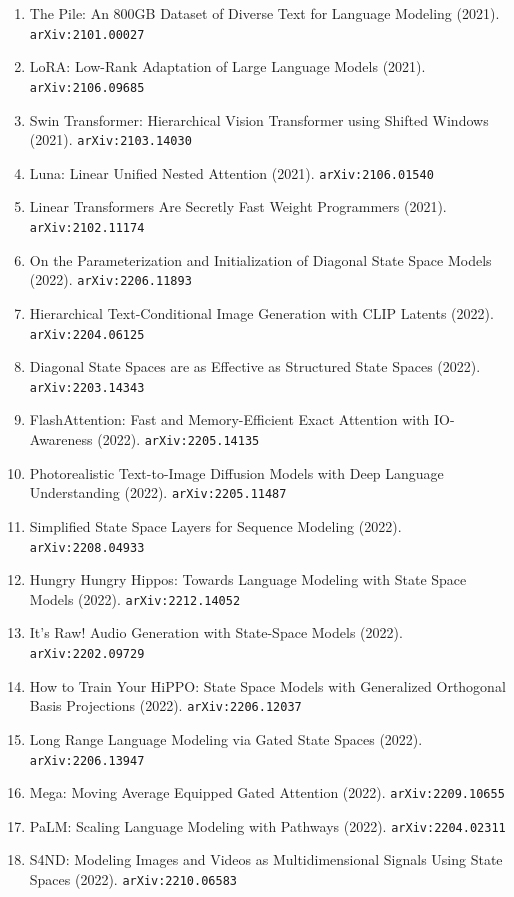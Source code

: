 \documentclass[11pt]{article}
\begin{document}
\begin{enumerate}
  \item The Pile: An 800GB Dataset of Diverse Text for Language Modeling (2021). \texttt{arXiv:2101.00027}
  \item LoRA: Low-Rank Adaptation of Large Language Models (2021). \texttt{arXiv:2106.09685}
  \item Swin Transformer: Hierarchical Vision Transformer using Shifted Windows (2021). \texttt{arXiv:2103.14030}
  \item Luna: Linear Unified Nested Attention (2021). \texttt{arXiv:2106.01540}
  \item Linear Transformers Are Secretly Fast Weight Programmers (2021). \texttt{arXiv:2102.11174}
  \item On the Parameterization and Initialization of Diagonal State Space
  Models (2022). \texttt{arXiv:2206.11893}
  \item Hierarchical Text-Conditional Image Generation with CLIP Latents (2022). \texttt{arXiv:2204.06125}
  \item Diagonal State Spaces are as Effective as Structured State Spaces (2022). \texttt{arXiv:2203.14343}
  \item FlashAttention: Fast and Memory-Efficient Exact Attention with
  IO-Awareness (2022). \texttt{arXiv:2205.14135}
  \item Photorealistic Text-to-Image Diffusion Models with Deep Language
  Understanding (2022). \texttt{arXiv:2205.11487}
  \item Simplified State Space Layers for Sequence Modeling (2022). \texttt{arXiv:2208.04933}
  \item Hungry Hungry Hippos: Towards Language Modeling with State Space Models (2022). \texttt{arXiv:2212.14052}
  \item It's Raw! Audio Generation with State-Space Models (2022). \texttt{arXiv:2202.09729}
  \item How to Train Your HiPPO: State Space Models with Generalized Orthogonal
  Basis Projections (2022). \texttt{arXiv:2206.12037}
  \item Long Range Language Modeling via Gated State Spaces (2022). \texttt{arXiv:2206.13947}
  \item Mega: Moving Average Equipped Gated Attention (2022). \texttt{arXiv:2209.10655}
  \item PaLM: Scaling Language Modeling with Pathways (2022). \texttt{arXiv:2204.02311}
  \item S4ND: Modeling Images and Videos as Multidimensional Signals Using State
  Spaces (2022). \texttt{arXiv:2210.06583}

\end{enumerate}
\end{document}

